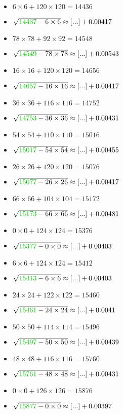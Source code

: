 \documentclass[12pt]{article}
\begin{document}
\begin{multicols}{2}
\begin{itemize}
\item $6\times6 + 120\times120 = 14436$
\item $\sqrt{ {\color{green!75!black}{14437}} - 6\times 6 } \approx [...] + 0.00417$
\item $78\times78 + 92\times92 = 14548$
\item $\sqrt{ {\color{green!75!black}{14549}} - 78\times 78 } \approx [...] + 0.00543$
\item $16\times16 + 120\times120 = 14656$
\item $\sqrt{ {\color{green!75!black}{14657}} - 16\times 16 } \approx [...] + 0.00417$
\item $36\times36 + 116\times116 = 14752$
\item $\sqrt{ {\color{green!75!black}{14753}} - 36\times 36 } \approx [...] + 0.00431$
\item $54\times54 + 110\times110 = 15016$
\item $\sqrt{ {\color{green!75!black}{15017}} - 54\times 54 } \approx [...] + 0.00455$
\item $26\times26 + 120\times120 = 15076$
\item $\sqrt{ {\color{green!75!black}{15077}} - 26\times 26 } \approx [...] + 0.00417$
\item $66\times66 + 104\times104 = 15172$
\item $\sqrt{ {\color{green!75!black}{15173}} - 66\times 66 } \approx [...] + 0.00481$
\item $0\times0 + 124\times124 = 15376$
\item $\sqrt{ {\color{green!75!black}{15377}} - 0\times 0 } \approx [...] + 0.00403$
\item $6\times6 + 124\times124 = 15412$
\item $\sqrt{ {\color{green!75!black}{15413}} - 6\times 6 } \approx [...] + 0.00403$
\item $24\times24 + 122\times122 = 15460$
\item $\sqrt{ {\color{green!75!black}{15461}} - 24\times 24 } \approx [...] + 0.0041$
\item $50\times50 + 114\times114 = 15496$
\item $\sqrt{ {\color{green!75!black}{15497}} - 50\times 50 } \approx [...] + 0.00439$
\item $48\times48 + 116\times116 = 15760$
\item $\sqrt{ {\color{green!75!black}{15761}} - 48\times 48 } \approx [...] + 0.00431$
\item $0\times0 + 126\times126 = 15876$
\item $\sqrt{ {\color{green!75!black}{15877}} - 0\times 0 } \approx [...] + 0.00397$

\end{itemize}
\end{multicols}
\end{document}
